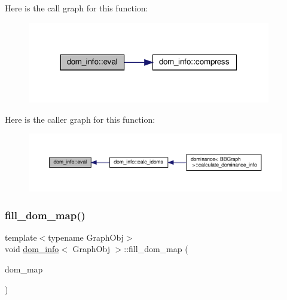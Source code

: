 Here is the call graph for this function\+:
\nopagebreak
\begin{figure}[H]
\begin{center}
\leavevmode
\includegraphics[width=301pt]{d3/dea/classdom__info_ab777c47542a377b76521d81f4fe89b7f_cgraph}
\end{center}
\end{figure}
Here is the caller graph for this function\+:
\nopagebreak
\begin{figure}[H]
\begin{center}
\leavevmode
\includegraphics[width=350pt]{d3/dea/classdom__info_ab777c47542a377b76521d81f4fe89b7f_icgraph}
\end{center}
\end{figure}
\mbox{\label{classdom__info_af9e42db7ab94585f85b213682e4e95f7}} 
\subsubsection{\texorpdfstring{fill\+\_\+dom\+\_\+map()}{fill\_dom\_map()}}
{\footnotesize\ttfamily template$<$typename Graph\+Obj$>$ \\
void \hyperlink{classdom__info}{dom\+\_\+info}$<$ Graph\+Obj $>$\+::fill\+\_\+dom\+\_\+map (\begin{DoxyParamCaption}\item[{\hyperlink{custom__map_8hpp_a7314a7df1cdb3a3acf478ab86e95c226}{Custom\+Unordered\+Map\+Stable}$<$ \hyperlink{classdom__info_a5e4ca21e2c5281bdbb95d2c8d965c9be}{Vertex}, \hyperlink{classdom__info_a5e4ca21e2c5281bdbb95d2c8d965c9be}{Vertex} $>$ \&}]{dom\+\_\+map }\end{DoxyParamCaption})\hspace{0.3cm}{\ttfamily [inline]}}



